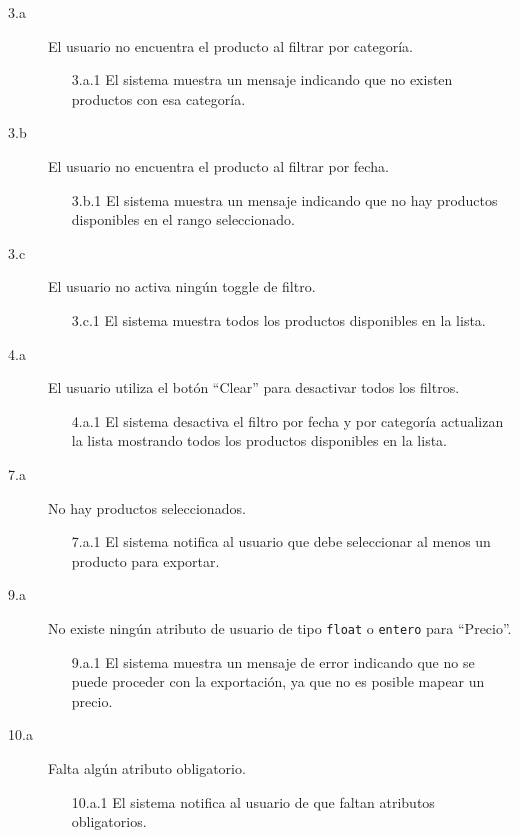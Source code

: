 \begin{description}
    \item[3.a] El usuario no encuentra el producto al filtrar por categoría.
    \begin{enumerate}
        \item[3.a.1] El sistema muestra un mensaje indicando que no existen productos con esa categoría.
    \end{enumerate}
    \item[3.b] El usuario no encuentra el producto al filtrar por fecha.
    \begin{enumerate}
        \item[3.b.1] El sistema muestra un mensaje indicando que no hay productos disponibles en el rango seleccionado.
    \end{enumerate}
    \item[3.c] El usuario no activa ningún toggle de filtro.
    \begin{enumerate}
        \item[3.c.1] El sistema muestra todos los productos disponibles en la lista.
    \end{enumerate}
    \item[4.a] El usuario utiliza el botón \enquote{Clear} para desactivar todos los filtros.
    \begin{enumerate}
        \item[4.a.1] El sistema desactiva el filtro por fecha y por categoría actualizan la lista mostrando todos los productos disponibles en la lista.
    \end{enumerate}
    \item[7.a] No hay productos seleccionados.
    \begin{enumerate}
        \item[7.a.1] El sistema notifica al usuario que debe seleccionar al menos un producto para exportar.
    \end{enumerate}
    \item[9.a] No existe ningún atributo de usuario de tipo \texttt{float} o \texttt{entero} para \enquote{Precio}.
    \begin{enumerate}
        \item[9.a.1] El sistema muestra un mensaje de error indicando que no se puede proceder con la exportación, ya que no es posible mapear un precio.
    \end{enumerate}
    \item[10.a] Falta algún atributo obligatorio.
    \begin{enumerate}
        \item[10.a.1] El sistema notifica al usuario de que faltan atributos obligatorios.
    \end{enumerate}
\end{description}

